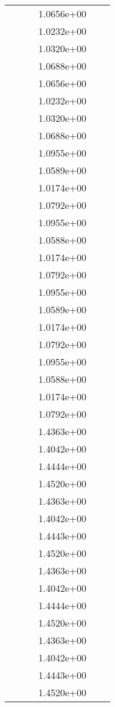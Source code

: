 \begin{xltabular}{\textwidth}{r|rS[table-format=1.3e+2]S[table-format=1.4e+2]S[table-format=1.4e+2]S[table-format=-1.5]}
&  &  & 1.0656e+00 & & \\
&  &  & 1.0232e+00 & & \\
&  &  & 1.0320e+00 & & \\
&  &  & 1.0688e+00 & & \\
&  &  & 1.0656e+00 & & \\
&  &  & 1.0232e+00 & & \\
&  &  & 1.0320e+00 & & \\
&  &  & 1.0688e+00 & & \\
&  &  & 1.0955e+00 & & \\
&  &  & 1.0589e+00 & & \\
&  &  & 1.0174e+00 & & \\
&  &  & 1.0792e+00 & & \\
&  &  & 1.0955e+00 & & \\
&  &  & 1.0588e+00 & & \\
&  &  & 1.0174e+00 & & \\
&  &  & 1.0792e+00 & & \\
&  &  & 1.0955e+00 & & \\
&  &  & 1.0589e+00 & & \\
&  &  & 1.0174e+00 & & \\
&  &  & 1.0792e+00 & & \\
&  &  & 1.0955e+00 & & \\
&  &  & 1.0588e+00 & & \\
&  &  & 1.0174e+00 & & \\
&  &  & 1.0792e+00 & & \\
&  &  & 1.4363e+00 & & \\
&  &  & 1.4042e+00 & & \\
&  &  & 1.4444e+00 & & \\
&  &  & 1.4520e+00 & & \\
&  &  & 1.4363e+00 & & \\
&  &  & 1.4042e+00 & & \\
&  &  & 1.4443e+00 & & \\
&  &  & 1.4520e+00 & & \\
&  &  & 1.4363e+00 & & \\
&  &  & 1.4042e+00 & & \\
&  &  & 1.4444e+00 & & \\
&  &  & 1.4520e+00 & & \\
&  &  & 1.4363e+00 & & \\
&  &  & 1.4042e+00 & & \\
&  &  & 1.4443e+00 & & \\
&  &  & 1.4520e+00 & & \\

\end{xltabular}
